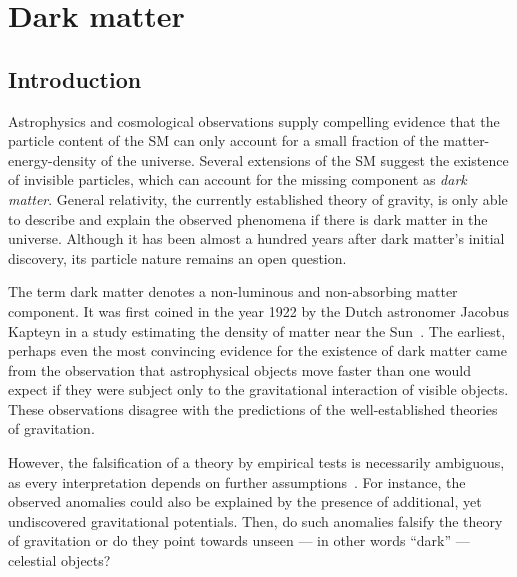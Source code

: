 \chapter{Dark matter}
\label{sec:dm}



\section{Introduction}
\label{sec:dm:intro}
Astrophysics and cosmological observations supply compelling evidence that the particle content of the SM can only account for a small fraction of the matter-energy-density of the universe. Several extensions of the SM suggest the existence of invisible particles, which can account for the missing component as \emph{dark matter}. General relativity, the currently established theory of gravity, is only able to describe and explain the observed phenomena if there is dark matter in the universe. Although it has been almost a hundred years after dark matter's initial discovery, its particle nature remains an open question.

The term dark matter denotes a non-luminous and non-absorbing matter component. It was first coined in the year 1922 by the Dutch astronomer Jacobus Kapteyn in a study estimating the density of matter near the Sun~\cite{Kapteyn1922}.
The earliest, perhaps even the most convincing evidence for the existence of dark matter came from the observation that astrophysical objects move faster than one would expect if they were subject only to the gravitational interaction of visible objects. These observations disagree with the predictions of the well-established theories of gravitation.

However, the falsification of a theory by empirical tests is necessarily ambiguous, as every interpretation depends on further assumptions~\cite{Duhem1954}. For instance, the observed anomalies could also be explained by the presence of additional, yet undiscovered gravitational potentials. Then, do such anomalies falsify the theory of gravitation or do they point towards unseen --- in other words ``dark'' --- celestial objects?

